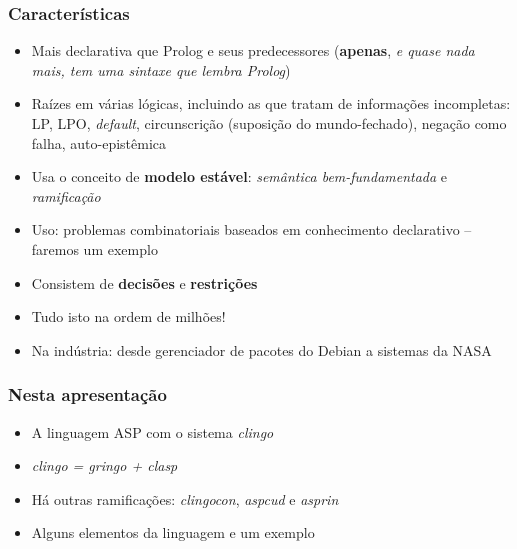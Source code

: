 \documentclass{beamer}
\begin{document}
\begin{frame}[fragile]

\frametitle{Características}


\begin{block}{}
  \begin{itemize}
  
  \item Mais declarativa que Prolog e seus predecessores (\textbf{apenas}, \emph{e quase nada mais, tem uma sintaxe que lembra Prolog})

  \item Raízes em várias lógicas, incluindo as que tratam de informações incompletas: LP, LPO, \emph{default}, circunscrição (suposição do mundo-fechado), negação como falha, auto-epistêmica
  
  \item Usa o conceito de \textbf{modelo estável}: \emph{semântica bem-fundamentada} e \emph{ramificação}

  \item Uso: problemas combinatoriais baseados em conhecimento declarativo -- faremos um exemplo

  \item Consistem de \textbf{decisões} e \textbf{restrições}

      \item Tudo isto na ordem de milhões!
      
      \item Na indústria: desde gerenciador de pacotes do Debian a sistemas da NASA
      
        

    \end{itemize}
  
\end{block}


\end{frame}


\begin{frame}[fragile]

\frametitle{Nesta apresentação}


\begin{block}{}
  \begin{itemize}
  
  \item A linguagem ASP com o sistema \emph{clingo}
  \item \emph{clingo = gringo + clasp}
  \item Há outras ramificações: \emph{clingocon}, \emph{aspcud} e \emph{asprin}
  \item Alguns elementos da linguagem e um exemplo

    \end{itemize}
  
 \end{block}

\end{frame}
\end{document}
